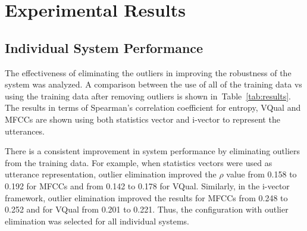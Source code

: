 \section{Experimental Results}

\subsection{Individual System Performance}
The effectiveness of eliminating the outliers in improving the robustness of the system was analyzed. A comparison between the use of all of the training data vs using the training data after removing outliers is shown in~Table~\ref{tab:results}. The results in terms of Spearman's correlation coefficient for entropy, VQual and MFCCs are shown using both statistics vector and i-vector to represent the utterances. 


There is a consistent improvement in system performance by eliminating outliers from the training data. For example, when statistics vectors were used as utterance representation, outlier elimination improved the $\rho$ value from 0.158 to 0.192 for MFCCs and from 0.142 to 0.178 for VQual. Similarly, in the i-vector framework, outlier elimination improved the results for MFCCs from 0.248 to 0.252 and for VQual from 0.201 to 0.221.
Thus, the configuration with outlier elimination was selected for all individual systems.

